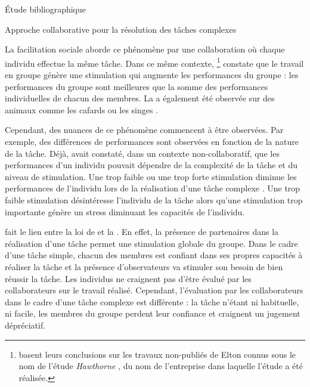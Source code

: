 \documentclass[myfrancais,ngerman,english,french]{mythesis}
\begin{document}
\begin{mychapter}{Étude bibliographique}
\begin{mysection}{Approche collaborative pour la résolution des tâches complexes}
\begin{mysubsection}{La facilitation sociale}
				 aborde ce phénomène par une collaboration où chaque individu effectue la même tâche.
				Dans ce même contexte, \footnote{ basent leurs conclusions sur les travaux non-publiés de Elton  connus sous le nom de \og l'étude \textit{Hawthorne} \fg, du nom de l'entreprise \myHawthorne dans laquelle l'étude a été réalisée.} constate que le travail en groupe génère une stimulation qui augmente les performances du groupe : les performances du groupe sont meilleures que la somme des performances individuelles de chacun des membres.
				La  a également été observée sur des animaux comme les cafards  ou les singes .

				Cependant, des nuances de ce phénomène commencent à être observées.
				Par exemple, des différences de performances sont observées en fonction de la nature de la tâche.
				Déjà,  avait constaté, dans un contexte non-collaboratif, que les performances d'un individu pouvait dépendre de la complexité de la tâche et du niveau de stimulation.
				Une trop faible ou une trop forte stimulation diminue les performances de l'individu lors de la réalisation d'une tâche complexe .
				Une trop faible stimulation désintéresse l'individu de la tâche alors qu'une stimulation trop importante génère un stress diminuant les capacités de l'individu.

				 fait le lien entre la loi de  et la .
				En effet, la présence de partenaires dans la réalisation d'une tâche permet une stimulation globale du groupe.
				Dans le cadre d'une tâche simple, chacun des membres est confiant dans ses propres capacités à réaliser la tâche et la présence d'observateurs va stimuler son besoin de bien réussir la tâche.
				Les individus ne craignent pas d'être évalué par les collaborateurs sur le travail réalisé.
				Cependant, l'évaluation par les collaborateurs dans le cadre d'une tâche complexe est différente : la tâche n'étant ni habituelle, ni facile, les membres du groupe perdent leur confiance et craignent un jugement dépréciatif.


\end{mysubsection}
\end{mysection}
\end{mychapter}
\end{document}
